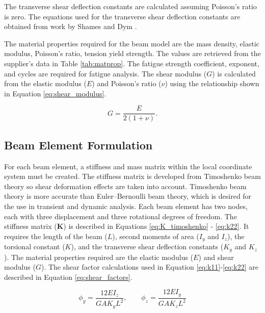\documentclass[doublespace,nopageskip]{VTthesis}
\begin{document}
			The transverse shear deflection constants are calculated assuming Poisson's ratio is zero. The equations used for the transverse shear deflection constants are obtained from work by Shames and Dym \cite{transshear}. 
			
			The material properties required for the beam model are the mass density, elastic modulus, Poisson's ratio, tension yield strength. The values are retrieved from the supplier's data in Table \ref{tab:matprop}. The fatigue strength coefficient, exponent, and cycles are required for fatigue analysis. 
			The shear modulus ($G$) is calculated from the elastic modulus ($E$) and Poisson's ratio ($\nu$) using the relationship shown in Equation \ref{eq:shear_modulus}.
			
			\begin{equation}
				G = \frac{E}{2(1+\nu)}.
				\label{eq:shear_modulus}
			\end{equation}
			
		\subsection{Beam Element Formulation} \label{se:beam_element_form}
		
		 	For each beam element, a stiffness and mass matrix within the local coordinate system must be created. The stiffness matrix is developed from Timoshenko beam theory so shear deformation effects are taken into account. Timoshenko beam theory is more accurate than Euler–Bernoulli beam theory, which is desired for the use in transient and dynamic analysis. Each beam element has two nodes, each with three displacement and three rotational degrees of freedom. The stiffness matrix ($\mathbf{K}$) is described in Equations \ref{eq:K_timoshenko} - \ref{eq:k22}. It requires the length of the beam ($L$), second moments of area ($I_y$ and $I_z$), the torsional constant ($K$), and the transverse shear deflection constants ($K_y$ and $K_z$). The material properties required are the elastic modulus ($E$) and shear modulus ($G$). The shear factor calculations used in Equation \ref{eq:k11}-\ref{eq:k22}  are described in Equation \ref{eq:shear_factors}.
			
			\begin{equation}
				\phi_y = \frac{12 E I_z}{G A K_y L^2}, \qquad
				\phi_z = \frac{12 E I_y}{G A K_z L^2}
				\label{eq:shear_factors}
			\end{equation}
			
\end{document}
